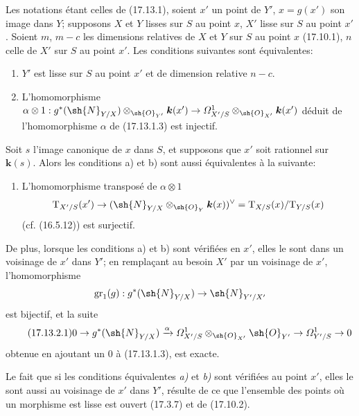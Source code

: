 \begin{proposition}[17.13.2]
\label{IV.17.13.2}
Les notations étant celles de \textup{(17.13.1)}, soient $x'$ un point de $Y'$, $x=g(x')$ son image dans $Y$; supposons $X$ et $Y$ lisses sur $S$ au point $x$, $X'$ lisse sur $S$ au point $x'$. Soient $m$, $m-c$ les dimensions relatives de $X$ et $Y$ sur $S$ au point $x$ \textup{(17.10.1)}, $n$ celle de $X'$ sur $S$ au point $x'$. Les conditions suivantes sont équivalentes:
\begin{enumerate}
  \item[\textup{a)}] $Y'$ est lisse sur $S$ au point $x'$ et de dimension relative $n-c$.
  \item[\textup{b)}] L'homomorphisme $\alpha\otimes1:g^*(\sh{N}_{Y/X})\otimes_{\sh{O}_{Y'}}\boldsymbol{k}(x')\to\varOmega^1_{X'/S}\otimes_{\sh{O}_{X'}}\boldsymbol{k}(x')$ déduit de l'homomorphisme $\alpha$ de \textup{(17.13.1.3)} est injectif.
\end{enumerate}

Soit $s$ l'image canonique de $x$ dans $S$, et supposons que $x'$ soit rationnel sur $\boldsymbol{k}(s)$. Alors les conditions \textup{a)} et \textup{b)} sont aussi équivalentes à la suivante:
\begin{enumerate}
  \item[\textup{b$'$)}] L'homomorphisme transposé de $\alpha\otimes1$
  \[
  \mathrm{T}_{X'/S}(x')\to(\sh{N}_{Y/X}\otimes_{\sh{O}_Y}\boldsymbol{k}(x))^\vee=\mathrm{T}_{X/S}(x)/\mathrm{T}_{Y/S}(x)
  \]
  \textup{(cf. (16.5.12))} est surjectif.
\end{enumerate}

De plus, lorsque les conditions \textup{a)} et \textup{b)} sont vérifiées en $x'$, elles le sont dans un voisinage de $x'$ dans $Y'$; en remplaçant au besoin $X'$ par un voisinage de $x'$, l'homomorphisme
\[
\operatorname{gr}_1(g):g^*(\sh{N}_{Y/X})\to\sh{N}_{Y'/X'}
\]
est bijectif, et la suite
\[
\label{IV.17.13.2.1}
\tag{17.13.2.1}
0\to g^*(\sh{N}_{Y/X})\xrightarrow{\alpha}\varOmega^1_{X'/S}\otimes_{\sh{O}_{X'}}\sh{O}_{Y'}\to\varOmega^1_{Y'/S}\to0
\]
obtenue en ajoutant un $0$ à \textup{(17.13.1.3)}, est exacte.
\end{proposition}

Le fait que si les conditions équivalentes \emph{a)} et \emph{b)} sont vérifiées au point $x'$, elles le sont aussi au voisinage de $x'$ dans $Y'$, résulte de ce que l'ensemble des points où un morphisme est lisse est ouvert (17.3.7) et de (17.10.2).

